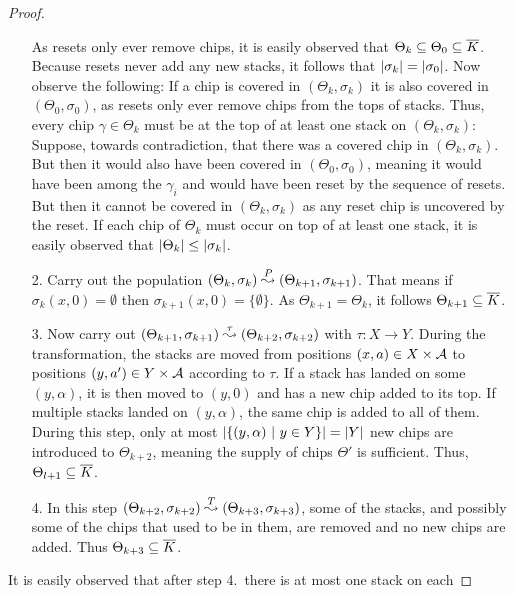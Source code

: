 \begin{proof}
\begin{enumerate}
    As resets only ever remove chips, it is easily observed that $\Theta_k \subseteq
    \Theta_0 \subseteq \overline{K}$. Because resets never add any new stacks, it follows
    that $|\sigma_k| = |\sigma_0|$.
    Now observe the following: If a chip is covered in $(\Theta_k, \sigma_k)$ it
    is also covered in $(\Theta_0, \sigma_0)$, as resets only ever remove chips from
    the tops of stacks. Thus, every chip $\gamma \in \Theta_k$ must be at the
    top of at least one stack on $(\Theta_k, \sigma_k)$: Suppose, towards
    contradiction, that there was a covered chip in $(\Theta_k, \sigma_k)$. But
    then it would also have been covered in $(\Theta_0, \sigma_0)$, meaning it would
    have been among the $\gamma_i$ and would have been reset by the sequence of
    resets. But then it cannot be covered in $(\Theta_k, \sigma_k)$ as any reset
    chip is uncovered by the reset. If each chip of $\Theta_k$ must occur on top
    of at least one stack, it is easily observed that $|\Theta_k| \leq
    |\sigma_k|$.
  \item[2.] Carry out the population $(\Theta_k, \sigma_k)
    \stackrel{P}{\leadsto} (\Theta_{k + 1}, \sigma_{k + 1})$. That means if $\sigma_k(x, 0) =
    \emptyset$ then $\sigma_{k + 1}(x, 0) = \{\emptyset\}$. As $\Theta_{k + 1} = \Theta_k$,
    it follows $\Theta_{k + 1} \subseteq \overline{K}$.
  \item[3.] Now carry out $(\Theta_{k + 1}, \sigma_{k + 1}) \stackrel{\tau}{\leadsto} (\Theta_{k + 2},
    \sigma_{k + 2})$ with $\tau \colon X \to Y$. During the transformation, the stacks are
    moved from positions $(x, a) \in X \times \mathcal{A}$ to positions $(y, a') \in Y
    \times \mathcal{A}$ according to $\tau$. If a stack has landed on some $(y,
    \alpha)$, it is then moved to $(y, 0)$ and has a new chip added to its top.
    If multiple stacks landed on $(y, \alpha)$, the same chip is added to all of
    them. During this step, only at most $|\{(y, \alpha) ~|~ y \in
      Y\}| = |Y|$ new chips are introduced to $\Theta_{k + 2}$, meaning the
    supply of chips $\Theta'$ is sufficient. Thus,
    $\Theta_{l + 1} \subseteq \overline{K}$.
  \item[4.] In this step $(\Theta_{k + 2}, \sigma_{k + 2}) \stackrel{T}{\leadsto} (\Theta_{k +
    3}, \sigma_{k + 3})$,
    some of the stacks, and possibly some of the chips that used to be in them,
    are removed and no new chips are added. Thus $\Theta_{k + 3} \subseteq \overline{K}$.
  \end{enumerate}
  It is easily observed that after step 4.~there is at most one stack on each

\end{proof}
